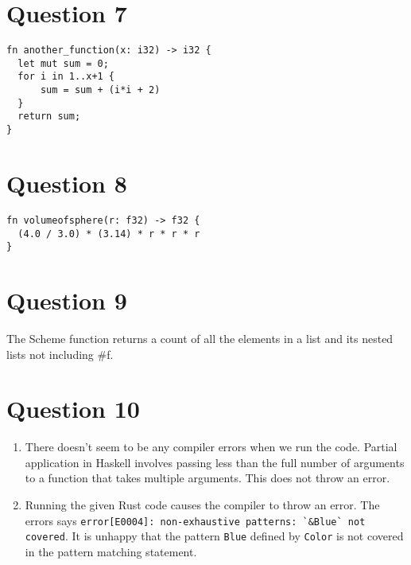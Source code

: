 \documentclass[8pt, letterpaper, titlepage]{article}
\begin{document}
\section*{Question 7}
\begin{lstlisting}
fn another_function(x: i32) -> i32 {
  let mut sum = 0;
  for i in 1..x+1 {
      sum = sum + (i*i + 2)
  }
  return sum;
}
\end{lstlisting}

\section*{Question 8}
\begin{lstlisting}
fn volumeofsphere(r: f32) -> f32 {
  (4.0 / 3.0) * (3.14) * r * r * r
}
\end{lstlisting}
\section*{Question 9}
The Scheme function returns a count of all the elements in a list and its nested lists not including \#f.

\section*{Question 10}
\begin{enumerate}[label=\alph*.]
  \item There doesn't seem to be any compiler errors when we run the code. Partial application in Haskell involves passing less than the full number of arguments to a function that takes multiple arguments. This does not throw an error.
  \item Running the given Rust code causes the compiler to throw an error. The errors says \lstinline{error[E0004]: non-exhaustive patterns: `&Blue` not covered}. It is unhappy that the pattern \lstinline{Blue} defined by \lstinline{Color} is not covered in the pattern matching statement.
\end{enumerate}
\end{document}

